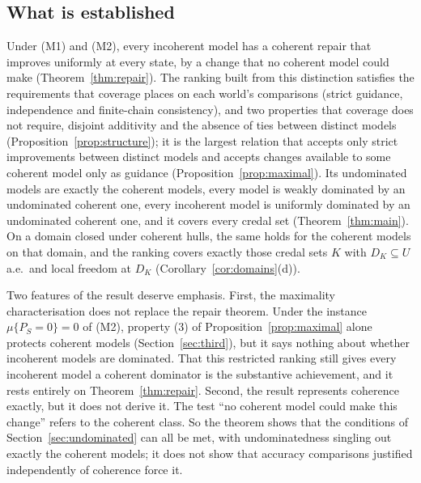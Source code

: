 \documentclass[11pt]{article}
\theoremstyle{plain}
\theoremstyle{definition}
\theoremstyle{remark}
\begin{document}
\subsection{What is established}

Under (M1) and (M2), every incoherent model has a coherent repair that improves uniformly at
every state, by a change that no coherent model could make (Theorem~\ref{thm:repair}). The
ranking built from this distinction satisfies the requirements that coverage places on each
world's comparisons (strict guidance, independence and finite-chain consistency), and two
properties that coverage does not require, disjoint additivity and the absence of ties between
distinct models (Proposition~\ref{prop:structure}); it is the largest relation that accepts only strict
improvements between distinct models and accepts changes available to some coherent model only
as guidance (Proposition~\ref{prop:maximal}). Its undominated models are exactly the coherent
models, every model is weakly dominated by an undominated coherent one, every incoherent model is
uniformly dominated by an undominated coherent one, and it covers every credal set
(Theorem~\ref{thm:main}). On a domain closed under coherent hulls, the same holds for the
coherent models on that domain, and the ranking covers exactly those credal sets $K$ with
$D_K\subseteq U$ a.e.\ and local freedom at $D_K$ (Corollary~\ref{cor:domains}(d)).

Two features of the result deserve emphasis. First, the maximality characterisation does not
replace the repair theorem. Under the instance $\mu\{P_S=0\}=0$ of (M2), property (3) of
Proposition~\ref{prop:maximal} alone protects coherent models (Section~\ref{sec:third}), but it says nothing about whether incoherent models are dominated.
That this restricted ranking still gives every incoherent model a coherent dominator is the
substantive achievement, and it rests entirely on Theorem~\ref{thm:repair}. Second, the result
represents coherence exactly, but it does not derive it. The test ``no coherent model could
make this change'' refers to the coherent class. So the theorem shows that the conditions of
Section~\ref{sec:undominated} can all be met, with undominatedness singling out exactly the
coherent models; it does not show that accuracy comparisons justified independently of coherence force it.
\end{document}
